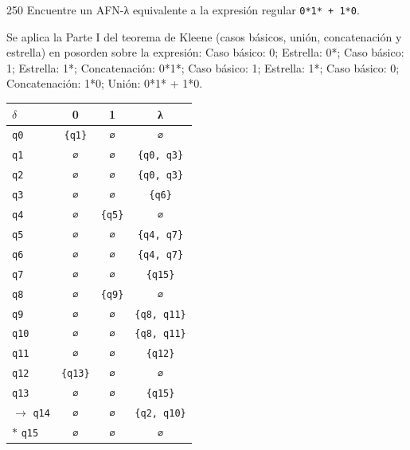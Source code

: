 \documentclass[11pt]{article}
\begin{document}
\begin{ejercicio}{250}{}
Encuentre un AFN-λ equivalente a la expresión regular \texttt{0*1* + 1*0}.
\end{ejercicio}
\proc Se aplica la Parte I del teorema de Kleene (casos básicos, unión, concatenación y estrella) en posorden sobre la expresión: Caso básico: 0; Estrella: 0*; Caso básico: 1; Estrella: 1*; Concatenación: 0*1*; Caso básico: 1; Estrella: 1*; Caso básico: 0; Concatenación: 1*0; Unión: 0*1* + 1*0.
\begin{center}\small\begin{tabular}{lccc}\toprule
$\delta$ & 0 & 1 & λ \\\midrule
 \texttt{q0} & \texttt{\{q1\}} & \texttt{∅} & \texttt{∅} \\
 \texttt{q1} & \texttt{∅} & \texttt{∅} & \texttt{\{q0, q3\}} \\
 \texttt{q2} & \texttt{∅} & \texttt{∅} & \texttt{\{q0, q3\}} \\
 \texttt{q3} & \texttt{∅} & \texttt{∅} & \texttt{\{q6\}} \\
 \texttt{q4} & \texttt{∅} & \texttt{\{q5\}} & \texttt{∅} \\
 \texttt{q5} & \texttt{∅} & \texttt{∅} & \texttt{\{q4, q7\}} \\
 \texttt{q6} & \texttt{∅} & \texttt{∅} & \texttt{\{q4, q7\}} \\
 \texttt{q7} & \texttt{∅} & \texttt{∅} & \texttt{\{q15\}} \\
 \texttt{q8} & \texttt{∅} & \texttt{\{q9\}} & \texttt{∅} \\
 \texttt{q9} & \texttt{∅} & \texttt{∅} & \texttt{\{q8, q11\}} \\
 \texttt{q10} & \texttt{∅} & \texttt{∅} & \texttt{\{q8, q11\}} \\
 \texttt{q11} & \texttt{∅} & \texttt{∅} & \texttt{\{q12\}} \\
 \texttt{q12} & \texttt{\{q13\}} & \texttt{∅} & \texttt{∅} \\
 \texttt{q13} & \texttt{∅} & \texttt{∅} & \texttt{\{q15\}} \\
$\to$ \texttt{q14} & \texttt{∅} & \texttt{∅} & \texttt{\{q2, q10\}} \\
$*$ \texttt{q15} & \texttt{∅} & \texttt{∅} & \texttt{∅} \\
\bottomrule\end{tabular}\end{center}
\end{document}
